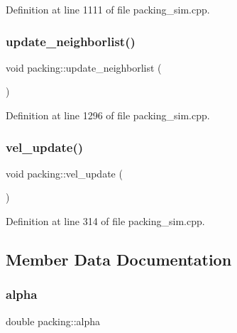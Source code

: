 Definition at line 1111 of file packing\+\_\+sim.\+cpp.

\mbox{\label{classpacking_adf9ce1e5fca0258a3c93cd76652ecc50}} 
\subsubsection{\texorpdfstring{update\+\_\+neighborlist()}{update\_neighborlist()}}
{\footnotesize\ttfamily void packing\+::update\+\_\+neighborlist (\begin{DoxyParamCaption}{ }\end{DoxyParamCaption})}



Definition at line 1296 of file packing\+\_\+sim.\+cpp.

\mbox{\label{classpacking_a027c3c89940dc7e8b317368ed32cfc15}} 
\subsubsection{\texorpdfstring{vel\+\_\+update()}{vel\_update()}}
{\footnotesize\ttfamily void packing\+::vel\+\_\+update (\begin{DoxyParamCaption}{ }\end{DoxyParamCaption})}



Definition at line 314 of file packing\+\_\+sim.\+cpp.



\subsection{Member Data Documentation}
\mbox{\label{classpacking_a9683c4c16704f81b0086a7639f030953}} 
\subsubsection{\texorpdfstring{alpha}{alpha}}
{\footnotesize\ttfamily double packing\+::alpha\hspace{0.3cm}{\ttfamily [protected]}}



